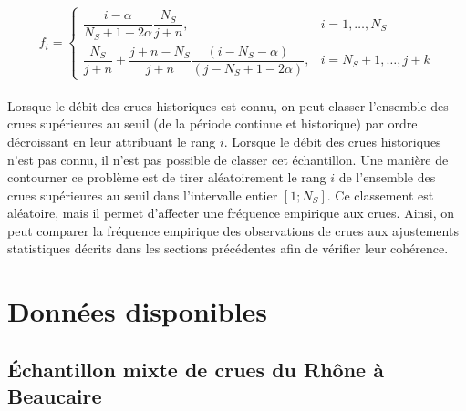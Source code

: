 		\begin{equation}	
		f_i = \begin{cases}\dfrac{i-\alpha}{N_S+1-2 \alpha} \dfrac{N_S}{j+n}, & i=1, \ldots, N_S \\ \dfrac{N_S}{j+n}+\dfrac{j+n-N_S}{j+n} \dfrac{(i-N_S-\alpha)}{(j-N_S+1-2\alpha)}, & i=N_S+1, \ldots, j+k\end{cases}
		\label{eq:FreqHisto}	
		\end{equation}
%	
%		
	
	\paragraph{} Lorsque le débit des crues historiques est connu, on peut classer l'ensemble des crues supérieures au seuil (de la période continue et historique) par ordre décroissant en leur attribuant le rang $i$. Lorsque le débit des crues historiques n'est pas connu, il n'est pas possible de classer cet échantillon. Une manière de contourner ce problème est de tirer aléatoirement le rang $i$ de l'ensemble des crues supérieures au seuil dans l'intervalle entier $\left[1;N_S\right]$. Ce classement est aléatoire, mais il permet d'affecter une fréquence empirique aux crues. Ainsi, on peut comparer la fréquence empirique des observations de crues aux ajustements statistiques décrits dans les sections précédentes afin de vérifier leur cohérence. 
		
		
\section{Données disponibles}
\label{sec:dataBcr}

	\subsection{Échantillon mixte de crues du Rhône à Beaucaire}
